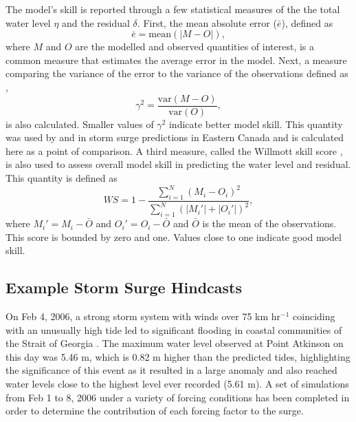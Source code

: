 \documentclass[pdftex,10pt]{article}
\begin{document}
The model's skill is reported through a few statistical measures of the the total water level $\eta$ and the residual $\delta$. First, the mean absolute error ($\bar{e}$), defined as
\begin{equation}
\bar{e} = \text{mean}\left(\left| M - O \right|\right),
\end{equation}
where $M$ and $O$ are the modelled and observed quantities of interest, is a common measure that estimates the average error in the model. Next, a measure comparing the variance of the error to the variance of the observations defined as \citep{thompson2003prediction},
\begin{equation}
\gamma^2 = \frac{\text{var}\left(M-O\right)}{\text{var}\left(O\right)},
\end{equation}
is also calculated. Smaller values of $\gamma^2$ indicate better model skill. This quantity was used by \citet{bernier2006predicting} and \citet{bernier2010tide} in storm surge predictions in Eastern Canada and is calculated here as a point of comparison. A third measure, called the Willmott skill score \citep{willmott1982some}, is also used to assess overall model skill in predicting the water level and residual. This quantity is defined as
\begin{equation}
WS = 1 - \frac{\sum_{i=1}^N \left(M_i - O_i\right)^2}{\sum_{i=1}^N \left(|M_i'| + |O_i'|\right)^2},
\end{equation} 
where $M_i' = M_i-\bar{O}$ and $O_i'=O_i-\bar{O}$ and $\bar{O}$ is the mean of the observations. This score is bounded by zero and one. Values close to one indicate good model skill. 


\subsection{Example Storm Surge Hindcasts}

On Feb 4, 2006, a strong storm system with winds over 75 km hr$^{-1}$ coinciding with an unusually high tide led to significant flooding in coastal communities of the Strait of Georgia \citep{romanowski2010storm}. The maximum water level observed at Point Atkinson on this day was 5.46 m, which is 0.82 m higher than the predicted tides, highlighting the significance of this event as it resulted in a large anomaly and also reached water levels close to the highest level ever recorded (5.61 m). A set of simulations from Feb 1 to 8, 2006 under a variety of forcing conditions has been completed in order to determine the contribution of each forcing factor to the surge.
\end{document}
